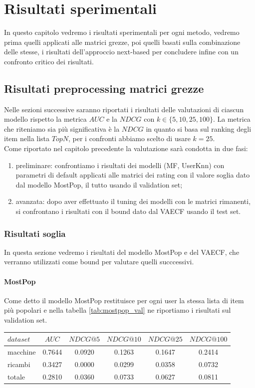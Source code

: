 \hypertarget{(chap:capitolo6)}{}
\chapter{Risultati sperimentali}
In questo capitolo vedremo i risultati sperimentali per ogni metodo, vedremo prima quelli applicati alle matrici grezze, poi quelli basati sulla combinazione delle stesse, i risultati dell'approccio next-based per concludere infine con un confronto critico dei risultati.
\section{Risultati preprocessing matrici grezze}
Nelle sezioni successive saranno riportati i risultati delle valutazioni di ciascun modello rispetto la metrica $AUC$ e la $NDCG$ con $k\in \{5, 10, 25, 100\}$.
La metrica che riteniamo sia più significativa è la $NDCG$ in quanto si basa sul ranking degli item nella lista $TopN$, per i confronti abbiamo scelto di usare $k=25$.\\
Come riportato nel capitolo precedente la valutazione sarà condotta in due fasi: 
\begin{enumerate}
    \item preliminare: confrontiamo i risultati dei modelli (MF, UserKnn) con parametri di default applicati alle matrici dei rating con il valore soglia dato dal modello MostPop, il tutto usando il validation set;
    \item avanzata: dopo aver effettuato il tuning dei modelli con le matrici rimanenti, si confrontano i risultati con il bound dato dal VAECF usando il test set.
\end{enumerate} 

\subsection{Risultati soglia}
In questa sezione vedremo i risultati del modello MostPop e del VAECF, che verranno utilizzati come bound per valutare quelli succcessivi. 

\subsubsection{MostPop}
Come detto il modello MostPop restituisce per ogni user la stessa lista di item più popolari e nella tabella \ref{tab:mostpop_val} ne riportiamo i risultati sul validation set.
\begin{center}
\begin{tabular}{|l|c|cccc|}
    \toprule
    $dataset$ &    $AUC$ &  $NDCG@5$ & $NDCG@10$  & $NDCG@25$ & $NDCG@100$  \\
    \midrule
    macchine & 0.7644 & 0.0920 & 0.1263 & 0.1647 &  0.2414 \\
    ricambi  & 0.3427 & 0.0000 & 0.0299 & 0.0358 &  0.0732 \\
    totale   & 0.2810 & 0.0360 & 0.0733 & 0.0627 &  0.0811 \\
\bottomrule
\end{tabular}
\label{tab:mostpop_val}
\end{center} 

